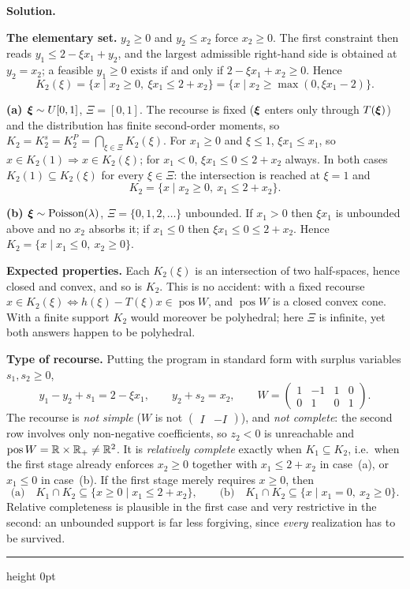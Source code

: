 \documentclass[11pt]{article}
\newenvironment{solution}
    {\par\nobreak\smallskip\noindent\textbf{Solution.}\par\nobreak\smallskip}
    {\par\medskip\hrule height 0pt\medskip}
\begin{document}
\begin{solution}
\textbf{The elementary set.} $y_2 \geq 0$ and $y_2 \leq x_2$ force $x_2 \geq 0$.
The first constraint then reads $y_1 \leq 2 - \xi x_1 + y_2$, and the largest
admissible right-hand side is obtained at $y_2 = x_2$; a feasible $y_1 \geq 0$
exists if and only if $2 - \xi x_1 + x_2 \geq 0$. Hence
\[
K_2(\xi) = \lbrace x \mid x_2 \geq 0,\ \xi x_1 \leq 2+x_2 \rbrace
= \lbrace x \mid x_2 \geq \max(0, \xi x_1 - 2) \rbrace .
\]

\textbf{(a) ${\boldsymbol{\xi}} \sim U[0,1]$}, $\Xi = [0,1]$. The recourse is fixed (${\boldsymbol{\xi}}$
enters only through $T({\boldsymbol{\xi}})$) and the distribution has finite second-order
moments, so $K_2 = K_2^s = K_2^P = \bigcap_{\xi \in \Xi} K_2(\xi)$.
For $x_1 \geq 0$ and $\xi \leq 1$, $\xi x_1 \leq x_1$, so
$x \in K_2(1) \Rightarrow x \in K_2(\xi)$; for $x_1 < 0$, $\xi x_1 \leq 0 \leq 2+x_2$
always. In both cases $K_2(1) \subseteq K_2(\xi)$ for every $\xi \in \Xi$: the
intersection is reached at $\xi = 1$ and
\[
K_2 = \lbrace x \mid x_2 \geq 0,\ x_1 \leq 2+x_2 \rbrace .
\]

\textbf{(b) ${\boldsymbol{\xi}} \sim \text{Poisson}(\lambda)$}, $\Xi = \lbrace 0,1,2,\ldots\rbrace$
unbounded. If $x_1 > 0$ then $\xi x_1$ is unbounded above and no $x_2$ absorbs
it; if $x_1 \leq 0$ then $\xi x_1 \leq 0 \leq 2+x_2$. Hence
$K_2 = \lbrace x \mid x_1 \leq 0,\ x_2 \geq 0 \rbrace$.

\textbf{Expected properties.} Each $K_2(\xi)$ is an intersection of two
half-spaces, hence closed and convex, and so is $K_2$. This is no accident: with
a fixed recourse $x \in K_2(\xi) \iff h(\xi)-T(\xi)x \in \operatorname{pos} W$,
and $\operatorname{pos} W$ is a closed convex cone. With a finite support $K_2$
would moreover be polyhedral; here $\Xi$ is infinite, yet both answers happen to
be polyhedral.

\textbf{Type of recourse.} Putting the program in standard form with surplus
variables $s_1, s_2 \geq 0$,
\[
y_1 - y_2 + s_1 = 2 - \xi x_1, \qquad y_2 + s_2 = x_2,
\qquad
W = \begin{pmatrix} 1 & -1 & 1 & 0 \\ 0 & 1 & 0 & 1 \end{pmatrix}.
\]
The recourse is \emph{not simple} ($W$ is not $\begin{pmatrix} I & -I\end{pmatrix}$),
and \emph{not complete}: the second row involves only non-negative coefficients,
so $z_2 < 0$ is unreachable and $\operatorname{pos} W = {\mathbb{R}} \times {\mathbb{R}}_+ \neq {\mathbb{R}}^2$.
It is \emph{relatively complete} exactly when $K_1 \subseteq K_2$, i.e.\ when the
first stage already enforces $x_2 \geq 0$ together with $x_1 \leq 2+x_2$ in
case~(a), or $x_1 \leq 0$ in case~(b). If the first stage merely requires
$x \geq 0$, then
\[
\text{(a)}\quad K_1 \cap K_2 \subseteq \lbrace x \geq 0 \mid x_1 \leq 2+x_2 \rbrace,
\qquad
\text{(b)}\quad K_1 \cap K_2 \subseteq \lbrace x \mid x_1 = 0,\ x_2 \geq 0 \rbrace .
\]
Relative completeness is plausible in the first case and very restrictive in the
second: an unbounded support is far less forgiving, since \emph{every}
realization has to be survived.
\end{solution}
\end{document}
